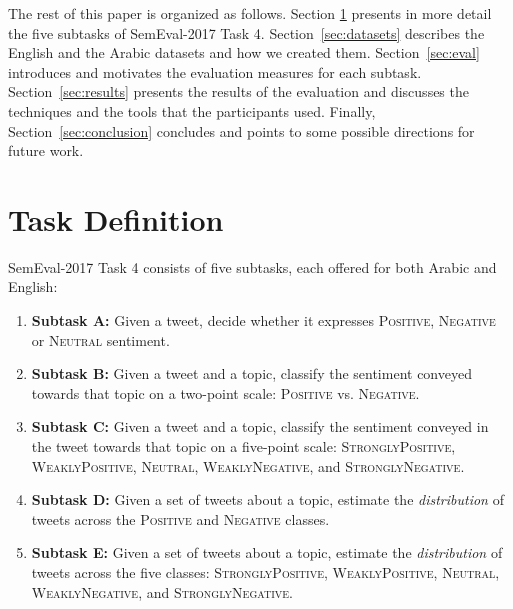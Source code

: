 \documentclass[11pt,a4paper]{article}
\begin{document}
The rest of this paper is organized as follows. Section \ref{sec:task} presents in more detail the five subtasks of SemEval-2017 Task 4. 
Section~\ref{sec:datasets} describes the English and the Arabic datasets and how we created them. Section~\ref{sec:eval} introduces and motivates the evaluation measures for each subtask. Section~\ref{sec:results} presents the results of the evaluation and discusses the techniques and the tools that the participants used.
Finally, Section~\ref{sec:conclusion} concludes and points to some possible directions for future work.

\section{Task Definition}
\label{sec:task}

\noindent SemEval-2017 Task 4 consists of five subtasks, each offered for both Arabic and English:

\begin{enumerate}
%
\item \textbf{Subtask A:} %
  Given a tweet, decide whether it expresses \textsc{Positive}, \textsc{Negative} or \textsc{Neutral} sentiment.

\item \textbf{Subtask B:} Given a tweet and a topic, classify the sentiment conveyed towards that topic on a two-point scale: \textsc{Positive} vs. \textsc{Negative}.

\item \textbf{Subtask C:} Given a tweet and a topic, classify the sentiment conveyed in the tweet towards that topic on a five-point scale: \textsc{StronglyPositive}, \textsc{WeaklyPositive}, \textsc{Neutral}, \textsc{WeaklyNegative}, and \textsc{StronglyNegative}.

\item \textbf{Subtask D:} Given a set of tweets about a topic, estimate the \textit{distribution} of tweets across the \textsc{Positive} and \textsc{Negative} classes.

\item \textbf{Subtask E:} Given a set of tweets about a topic, estimate the \textit{distribution} of tweets across the five classes: \textsc{StronglyPositive}, \textsc{WeaklyPositive}, \textsc{Neutral}, \textsc{WeaklyNegative}, and \textsc{StronglyNegative}.


\end{enumerate}
\end{document}
